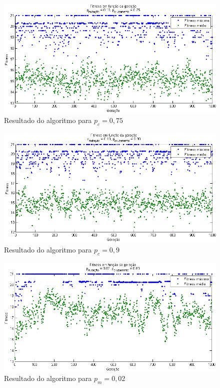 \documentclass[12pt]{elsarticle}
\begin{document}
	\begin{figure}[h]
		\centering
		\includegraphics[width=13cm]{img/pc_075.png}
		\caption{Resultado do algoritmo para $p_{c}=0,75$}
		\label{fig:pc_075}
	\end{figure}
	\newpage
	
	\begin{figure}[h]
		\centering
		\includegraphics[width=13cm]{img/pc_09.png}
		\caption{Resultado do algoritmo para $p_{c}=0,9$}
		\label{fig:pc_09}
	\end{figure}
	
	\begin{figure}[h]
		\centering
		\includegraphics[width=13cm]{img/pm_002.png}
		\caption{Resultado do algoritmo para $p_{m}=0,02$}
		\label{fig:pm_002}
	\end{figure}
	
\end{document}
